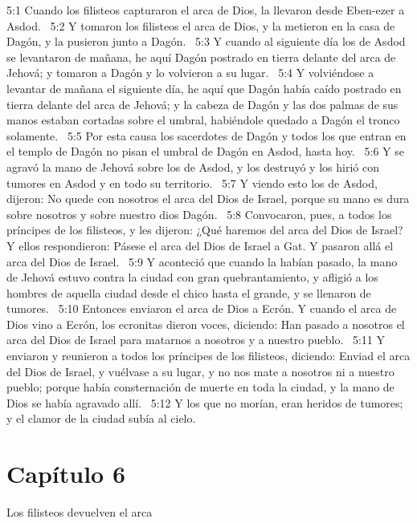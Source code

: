 5:1 Cuando los filisteos capturaron el arca de Dios, la llevaron desde Eben-ezer a Asdod.  
5:2 Y tomaron los filisteos el arca de Dios, y la metieron en la casa de Dagón, y la pusieron junto a Dagón.  
5:3 Y cuando al siguiente día los de Asdod se levantaron de mañana, he aquí Dagón postrado en tierra delante del arca de Jehová; y tomaron a Dagón y lo volvieron a su lugar.  
5:4 Y volviéndose a levantar de mañana el siguiente día, he aquí que Dagón había caído postrado en tierra delante del arca de Jehová; y la cabeza de Dagón y las dos palmas de sus manos estaban cortadas sobre el umbral, habiéndole quedado a Dagón el tronco solamente.  
5:5 Por esta causa los sacerdotes de Dagón y todos los que entran en el templo de Dagón no pisan el umbral de Dagón en Asdod, hasta hoy.  
5:6 Y se agravó la mano de Jehová sobre los de Asdod, y los destruyó y los hirió con tumores en Asdod y en todo su territorio.  
5:7 Y viendo esto los de Asdod, dijeron: No quede con nosotros el arca del Dios de Israel, porque su mano es dura sobre nosotros y sobre nuestro dios Dagón.  
5:8 Convocaron, pues, a todos los príncipes de los filisteos, y les dijeron: ¿Qué haremos del arca del Dios de Israel? Y ellos respondieron: Pásese el arca del Dios de Israel a Gat. Y pasaron allá el arca del Dios de Israel.  
5:9 Y aconteció que cuando la habían pasado, la mano de Jehová estuvo contra la ciudad con gran quebrantamiento, y afligió a los hombres de aquella ciudad desde el chico hasta el grande, y se llenaron de tumores.  
5:10 Entonces enviaron el arca de Dios a Ecrón. Y cuando el arca de Dios vino a Ecrón, los ecronitas dieron voces, diciendo: Han pasado a nosotros el arca del Dios de Israel para matarnos a nosotros y a nuestro pueblo.  
5:11 Y enviaron y reunieron a todos los príncipes de los filisteos, diciendo: Enviad el arca del Dios de Israel, y vuélvase a su lugar, y no nos mate a nosotros ni a nuestro pueblo; porque había consternación de muerte en toda la ciudad, y la mano de Dios se había agravado allí.  
5:12 Y los que no morían, eran heridos de tumores; y el clamor de la ciudad subía al cielo.  
\section*{Capítulo 6}
Los filisteos devuelven el arca  

